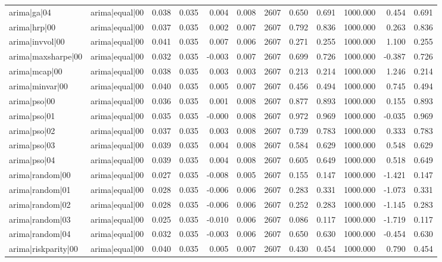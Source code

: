 \begin{table}
\begin{tabular}{llrrrrrrrrrr}
arima|ga|04 & arima|equal|00 & 0.038 & 0.035 & 0.004 & 0.008 & 2607 & 0.650 & 0.691 & 1000.000 & 0.454 & 0.691 \\
arima|hrp|00 & arima|equal|00 & 0.037 & 0.035 & 0.002 & 0.007 & 2607 & 0.792 & 0.836 & 1000.000 & 0.263 & 0.836 \\
arima|invvol|00 & arima|equal|00 & 0.041 & 0.035 & 0.007 & 0.006 & 2607 & 0.271 & 0.255 & 1000.000 & 1.100 & 0.255 \\
arima|maxsharpe|00 & arima|equal|00 & 0.032 & 0.035 & -0.003 & 0.007 & 2607 & 0.699 & 0.726 & 1000.000 & -0.387 & 0.726 \\
arima|mcap|00 & arima|equal|00 & 0.038 & 0.035 & 0.003 & 0.003 & 2607 & 0.213 & 0.214 & 1000.000 & 1.246 & 0.214 \\
arima|minvar|00 & arima|equal|00 & 0.040 & 0.035 & 0.005 & 0.007 & 2607 & 0.456 & 0.494 & 1000.000 & 0.745 & 0.494 \\
arima|pso|00 & arima|equal|00 & 0.036 & 0.035 & 0.001 & 0.008 & 2607 & 0.877 & 0.893 & 1000.000 & 0.155 & 0.893 \\
arima|pso|01 & arima|equal|00 & 0.035 & 0.035 & -0.000 & 0.008 & 2607 & 0.972 & 0.969 & 1000.000 & -0.035 & 0.969 \\
arima|pso|02 & arima|equal|00 & 0.037 & 0.035 & 0.003 & 0.008 & 2607 & 0.739 & 0.783 & 1000.000 & 0.333 & 0.783 \\
arima|pso|03 & arima|equal|00 & 0.039 & 0.035 & 0.004 & 0.008 & 2607 & 0.584 & 0.629 & 1000.000 & 0.548 & 0.629 \\
arima|pso|04 & arima|equal|00 & 0.039 & 0.035 & 0.004 & 0.008 & 2607 & 0.605 & 0.649 & 1000.000 & 0.518 & 0.649 \\
arima|random|00 & arima|equal|00 & 0.027 & 0.035 & -0.008 & 0.005 & 2607 & 0.155 & 0.147 & 1000.000 & -1.421 & 0.147 \\
arima|random|01 & arima|equal|00 & 0.028 & 0.035 & -0.006 & 0.006 & 2607 & 0.283 & 0.331 & 1000.000 & -1.073 & 0.331 \\
arima|random|02 & arima|equal|00 & 0.028 & 0.035 & -0.006 & 0.006 & 2607 & 0.252 & 0.283 & 1000.000 & -1.145 & 0.283 \\
arima|random|03 & arima|equal|00 & 0.025 & 0.035 & -0.010 & 0.006 & 2607 & 0.086 & 0.117 & 1000.000 & -1.719 & 0.117 \\
arima|random|04 & arima|equal|00 & 0.032 & 0.035 & -0.003 & 0.006 & 2607 & 0.650 & 0.630 & 1000.000 & -0.454 & 0.630 \\
arima|riskparity|00 & arima|equal|00 & 0.040 & 0.035 & 0.005 & 0.007 & 2607 & 0.430 & 0.454 & 1000.000 & 0.790 & 0.454 \\

\end{tabular}
\end{table}
